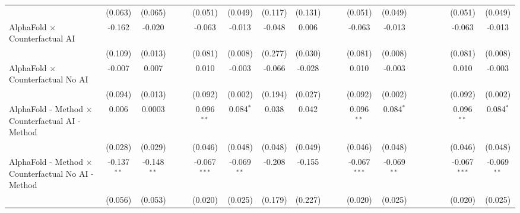 \begin{tabular}{lcccccccccccccccccc}
                                                              & (0.063)       & (0.065)       &     &     & (0.051)        & (0.049)       & (0.117)     & (0.131) &     &      & (0.051)        & (0.049)       &      &      &      &      & (0.051)        & (0.049)\\   
   AlphaFold $\times$ Counterfactual AI                       & -0.162        & -0.020        &     &     & -0.063         & -0.013        & -0.048      & 0.006   &     &      & -0.063         & -0.013        &      &      &      &      & -0.063         & -0.013\\   
                                                              & (0.109)       & (0.013)       &     &     & (0.081)        & (0.008)       & (0.277)     & (0.030) &     &      & (0.081)        & (0.008)       &      &      &      &      & (0.081)        & (0.008)\\   
   AlphaFold $\times$ Counterfactual No AI                    & -0.007        & 0.007         &     &     & 0.010          & -0.003        & -0.066      & -0.028  &     &      & 0.010          & -0.003        &      &      &      &      & 0.010          & -0.003\\   
                                                              & (0.094)       & (0.013)       &     &     & (0.092)        & (0.002)       & (0.194)     & (0.027) &     &      & (0.092)        & (0.002)       &      &      &      &      & (0.092)        & (0.002)\\   
   AlphaFold - Method $\times$ Counterfactual AI - Method     & 0.006         & 0.0003        &     &     & 0.096$^{**}$   & 0.084$^{*}$   & 0.038       & 0.042   &     &      & 0.096$^{**}$   & 0.084$^{*}$   &      &      &      &      & 0.096$^{**}$   & 0.084$^{*}$\\   
                                                              & (0.028)       & (0.029)       &     &     & (0.046)        & (0.048)       & (0.048)     & (0.049) &     &      & (0.046)        & (0.048)       &      &      &      &      & (0.046)        & (0.048)\\   
   AlphaFold - Method $\times$ Counterfactual No AI - Method  & -0.137$^{**}$ & -0.148$^{**}$ &     &     & -0.067$^{***}$ & -0.069$^{**}$ & -0.208      & -0.155  &     &      & -0.067$^{***}$ & -0.069$^{**}$ &      &      &      &      & -0.067$^{***}$ & -0.069$^{**}$\\   
                                                              & (0.056)       & (0.053)       &     &     & (0.020)        & (0.025)       & (0.179)     & (0.227) &     &      & (0.020)        & (0.025)       &      &      &      &      & (0.020)        & (0.025)\\   

\end{tabular}
